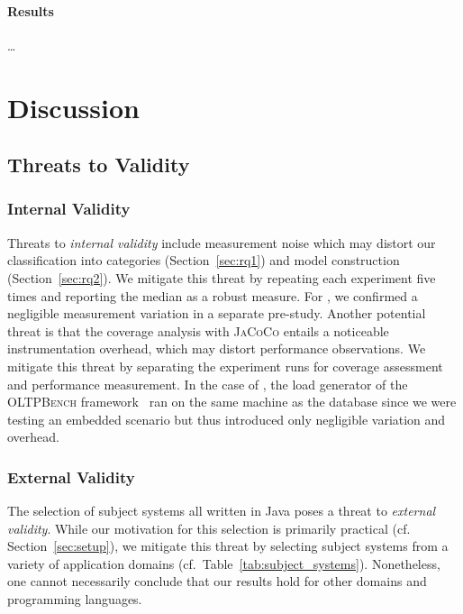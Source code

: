 {\paragraph*{Results}
{\color{red}\ldots}


\section{Discussion}\label{sec:discussion}

\subsection{Threats to Validity}
\subsubsection{Internal Validity}\label{sec:internal_validity}
Threats to \emph{internal validity} include measurement noise which may distort our classification into categories (Section~\ref{sec:rq1}) and model construction (Section~\ref{sec:rq2}). We mitigate this threat by repeating each experiment five times and reporting the median as a robust measure. For \htwo, we confirmed a negligible measurement variation in a separate pre-study.
Another potential threat is that the coverage analysis with \mbox{\textsc{JaCoCo}} entails a noticeable instrumentation overhead, which may distort performance observations. We mitigate this threat by separating the experiment runs for coverage assessment and performance measurement. In the case of \htwo, the load generator of the \textsc{OLTPBench} framework~\cite{difallah_oltp_2013} ran on the same machine as the database since we were testing an embedded scenario but thus introduced only negligible variation and overhead.

\subsubsection{External Validity}\label{sec:external_validity}
The selection of subject systems all written in Java poses a threat to \emph{external validity}. While our motivation for this selection is primarily practical (cf. Section~\ref{sec:setup}), we mitigate this threat by selecting subject systems from a variety of application domains (cf.~Table~\ref{tab:subject_systems}). Nonetheless, one cannot necessarily conclude that our results hold for other domains and programming languages. 

}
